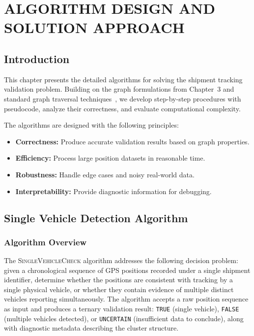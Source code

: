 \chapter{ALGORITHM DESIGN AND SOLUTION APPROACH}

\section{Introduction}
This chapter presents the detailed algorithms for solving the shipment tracking validation problem. Building on the graph formulations from Chapter~3 and standard graph traversal techniques~\cite{cormen2022introduction}, we develop step-by-step procedures with pseudocode, analyze their correctness, and evaluate computational complexity.

The algorithms are designed with the following principles:
\begin{itemize}
    \item \textbf{Correctness:} Produce accurate validation results based on graph properties.
    \item \textbf{Efficiency:} Process large position datasets in reasonable time.
    \item \textbf{Robustness:} Handle edge cases and noisy real-world data.
    \item \textbf{Interpretability:} Provide diagnostic information for debugging.
\end{itemize}

\section{Single Vehicle Detection Algorithm}

\subsection{Algorithm Overview}

The \textsc{SingleVehicleCheck} algorithm addresses the following decision problem: given a chronological sequence of GPS positions recorded under a single shipment identifier, determine whether the positions are consistent with tracking by a single physical vehicle, or whether they contain evidence of multiple distinct vehicles reporting simultaneously. The algorithm accepts a raw position sequence as input and produces a ternary validation result: \texttt{TRUE} (single vehicle), \texttt{FALSE} (multiple vehicles detected), or \texttt{UNCERTAIN} (insufficient data to conclude), along with diagnostic metadata describing the cluster structure.

